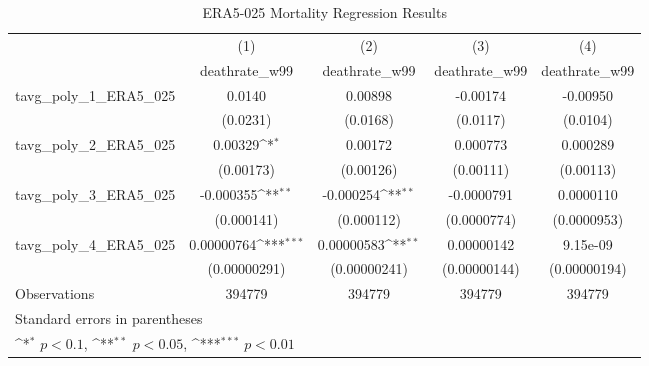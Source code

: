 \begin{table}[htbp]\centering
\def\sym#1{\ifmmode^{#1}\else\(^{#1}\)\fi}
\caption{ERA5-025 Mortality Regression Results}
\begin{tabular}{l*{4}{c}}
\hline\hline
                    &\multicolumn{1}{c}{(1)}&\multicolumn{1}{c}{(2)}&\multicolumn{1}{c}{(3)}&\multicolumn{1}{c}{(4)}\\
                    &\multicolumn{1}{c}{deathrate\_w99}&\multicolumn{1}{c}{deathrate\_w99}&\multicolumn{1}{c}{deathrate\_w99}&\multicolumn{1}{c}{deathrate\_w99}\\
\hline
tavg\_poly\_1\_ERA5\_025&      0.0140         &     0.00898         &    -0.00174         &    -0.00950         \\
                    &    (0.0231)         &    (0.0168)         &    (0.0117)         &    (0.0104)         \\
[1em]
tavg\_poly\_2\_ERA5\_025&     0.00329\sym{*}  &     0.00172         &    0.000773         &    0.000289         \\
                    &   (0.00173)         &   (0.00126)         &   (0.00111)         &   (0.00113)         \\
[1em]
tavg\_poly\_3\_ERA5\_025&   -0.000355\sym{**} &   -0.000254\sym{**} &  -0.0000791         &   0.0000110         \\
                    &  (0.000141)         &  (0.000112)         & (0.0000774)         & (0.0000953)         \\
[1em]
tavg\_poly\_4\_ERA5\_025&  0.00000764\sym{***}&  0.00000583\sym{**} &  0.00000142         &    9.15e-09         \\
                    &(0.00000291)         &(0.00000241)         &(0.00000144)         &(0.00000194)         \\
\hline
Observations        &      394779         &      394779         &      394779         &      394779         \\
\hline\hline
\multicolumn{5}{l}{\footnotesize Standard errors in parentheses}\\
\multicolumn{5}{l}{\footnotesize \sym{*} \(p<0.1\), \sym{**} \(p<0.05\), \sym{***} \(p<0.01\)}\\
\end{tabular}
\end{table}
